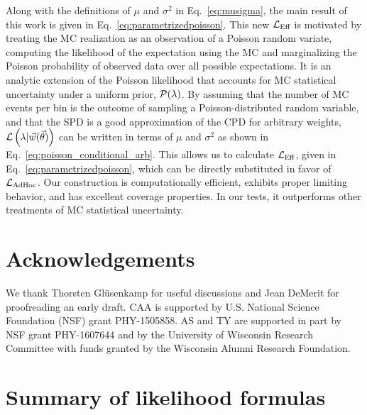 Along with the definitions of $\mu$ and $\sigma^2$ in Eq.~\eqref{eq:musigma}, the main result of this work is given in Eq.~\eqref{eq:parametrizedpoisson}. This new $\mathcal{L}_\textmd{Eff}$ is motivated by treating the MC realization as an observation of a Poisson random variate, computing the likelihood of the expectation using the MC and marginalizing the Poisson probability of observed data over all possible expectations. It is an analytic extension of the Poisson likelihood that accounts for MC statistical uncertainty under a uniform prior, $\mathcal{P}(\lambda)$. By assuming that the number of MC events per bin is the outcome of sampling a Poisson-distributed random variable, and that the SPD is a good approximation of the CPD for arbitrary weights, $\mathcal{L} \left(\lambda|\vec{w}(\vec{\theta})\right)$ can be written in terms of $\mu$ and $\sigma^2$ as shown in Eq.~\eqref{eq:poisson_conditional_arb}. This allows us to calculate $\mathcal{L}_\textmd{Eff}$, given in Eq.~\eqref{eq:parametrizedpoisson}, which can be directly substituted in favor of $\mathcal{L}_{\textmd{AdHoc}}$. Our construction is computationally efficient, exhibits proper limiting behavior, and has excellent coverage properties. In our tests, it outperforms other treatments of MC statistical uncertainty.

\section*{Acknowledgements} \label{sec:ack}

We thank Thorsten Gl\"usenkamp for useful discussions and Jean DeMerit for proofreading an early draft. CAA is supported by U.S. National Science Foundation (NSF) grant PHY-1505858. AS and TY are supported in part by NSF grant PHY-1607644 and by the University of Wisconsin Research Committee with funds granted by the Wisconsin Alumni Research Foundation.

\newpage

\appendix

\ifx \standalonesupplemental\undefined
\setcounter{page}{1}
\setcounter{figure}{0}
\setcounter{table}{0}
\setcounter{equation}{0}
\fi

\renewcommand{\thepage}{Supplementary Methods and Tables -- S\arabic{page}}
\renewcommand{\figurename}{SUPPL. FIG.}
\renewcommand{\tablename}{SUPPL. TABLE}
\renewcommand{\arraystretch}{2}

\renewcommand{\theequation}{A\arabic{equation}}

\section{Summary of likelihood formulas\label{sec:appendixA}}

